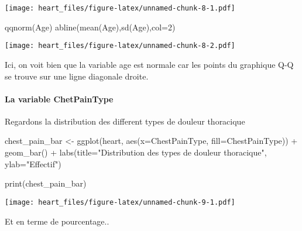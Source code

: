 \documentclass[
]{article}
\newenvironment{Shaded}{\begin{snugshade}}{\end{snugshade}}
\newcommand{\AttributeTok}[1]{\textcolor[rgb]{0.77,0.63,0.00}{#1}}
\newcommand{\DecValTok}[1]{\textcolor[rgb]{0.00,0.00,0.81}{#1}}
\newcommand{\FunctionTok}[1]{\textcolor[rgb]{0.00,0.00,0.00}{#1}}
\newcommand{\NormalTok}[1]{#1}
\newcommand{\OtherTok}[1]{\textcolor[rgb]{0.56,0.35,0.01}{#1}}
\newcommand{\SpecialCharTok}[1]{\textcolor[rgb]{0.00,0.00,0.00}{#1}}
\newcommand{\StringTok}[1]{\textcolor[rgb]{0.31,0.60,0.02}{#1}}
\begin{document}
\texttt{[image: heart\_files/figure-latex/unnamed-chunk-8-1.pdf]}

\begin{Shaded}
\begin{Highlighting}[]
\FunctionTok{qqnorm}\NormalTok{(Age)}
\FunctionTok{abline}\NormalTok{(}\FunctionTok{mean}\NormalTok{(Age),}\FunctionTok{sd}\NormalTok{(Age),}\AttributeTok{col=}\DecValTok{2}\NormalTok{)}
\end{Highlighting}
\end{Shaded}

\texttt{[image: heart\_files/figure-latex/unnamed-chunk-8-2.pdf]}

Ici, on voit bien que la variable age est normale car les points du
graphique Q-Q se trouve sur une ligne diagonale droite.

\hypertarget{la-variable-chetpaintype}{%
\paragraph{\texorpdfstring{La variable
\textbf{ChetPainType}}{La variable ChetPainType}}\label{la-variable-chetpaintype}}

Regardons la distribution des different types de douleur thoracique

\begin{Shaded}
\begin{Highlighting}[]
\NormalTok{chest\_pain\_bar }\OtherTok{\textless{}{-}} \FunctionTok{ggplot}\NormalTok{(heart, }\FunctionTok{aes}\NormalTok{(}\AttributeTok{x=}\NormalTok{ChestPainType, }\AttributeTok{fill=}\NormalTok{ChestPainType)) }\SpecialCharTok{+}
  \FunctionTok{geom\_bar}\NormalTok{() }\SpecialCharTok{+}
  \FunctionTok{labs}\NormalTok{(}\AttributeTok{title=}\StringTok{"Distribution des types de douleur thoracique"}\NormalTok{, }\AttributeTok{ylab=}\StringTok{"Effectif"}\NormalTok{)}

\FunctionTok{print}\NormalTok{(chest\_pain\_bar)}
\end{Highlighting}
\end{Shaded}

\texttt{[image: heart\_files/figure-latex/unnamed-chunk-9-1.pdf]}

Et en terme de pourcentage..
\end{document}
